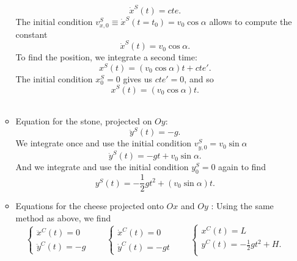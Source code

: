 \begin{enumerate}
\begin{itemize}
\[
\dot{x}^S(t) = cte.
\]
The initial condition  $v_{x,0}^S  \equiv \dot{x}^S(t=t_0) = v_0\cos\alpha$ allows to compute the constant
\[
\dot{x}^S(t) = v_0\cos\alpha.
\]
To find the position, we integrate a second time: 
\[
x^S(t)=(v_0\cos\alpha) t + cte'.
\]
The initial condition $x_0^S = 0$ gives us $cte' = 0$, and so
\[
x^S(t)=(v_0\cos\alpha) t.
\]\\
\item Equation for the stone, projected on $Oy$:
\[
\ddot{y}^S(t) = -g.
\]
We integrate once and use the initial condition $v_{y,0}^S = v_0\sin\alpha$
\[
\dot{y}^S(t) = -gt + v_0\sin\alpha.
\]
And we integrate and use the initial condition $y_0^S = 0$ again to find
\[
y^S(t)= -\frac{1}{2}gt^2 + (v_0\sin\alpha) t.
\]
\item Equations for the cheese projected onto $Ox$ and $Oy$ :
Using the same method as above, we find
\begin{displaymath}
\left\{ \begin{array}{l}
\ddot{x}^C(t) = 0 \\
\ddot{y}^C(t) = -g 
\end{array}\right.\qquad
\left\{ \begin{array}{l}
\dot{x}^C(t) = 0 \\
\dot{y}^C(t) = -gt
\end{array}\right.\qquad
\left\{ \begin{array}{l}
{x}^C(t) = L \\
{y}^C(t) = -\frac{1}{2}gt^2 +H. \\
\end{array}\right.
\end{displaymath}\\
\end{itemize} 


\end{enumerate}
